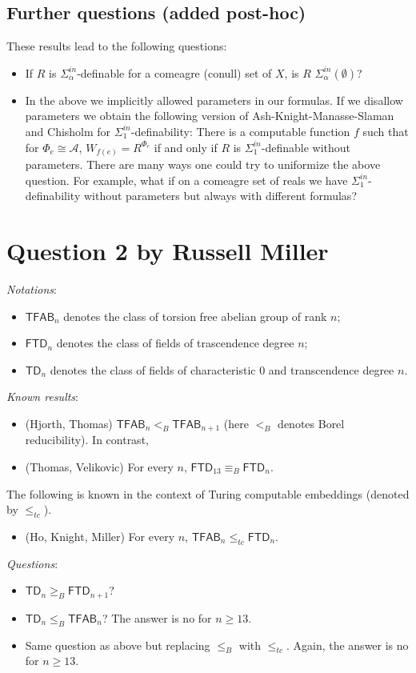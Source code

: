 \documentclass{article}
\begin{document}
\subsection*{Further questions (added post-hoc)}
These results lead to the following questions:
\begin{itemize}
    \item If $R$ is $\Sigma_\alpha^{in}$-definable for a comeagre (conull) set
        of $X$, is $R$ $\Sigma_{\alpha}^{in}(\emptyset)$?
    \item In the above we implicitly allowed parameters in our formulas. If we disallow
parameters we obtain the following version of Ash-Knight-Manasse-Slaman and
Chisholm for $\Sigma_1^{in}$-definability: There is a computable function $f$ such that for
$\Phi_e\cong \mathcal A$, $W_{f(e)}=R^{\Phi_e}$ if and only if $R$ is
$\Sigma_1^{in}$-definable without parameters. 
There are many ways one could try to uniformize the above question. For example,
what if on a comeagre set of reals we have $\Sigma^{in}_1$-definability without
parameters but always with different formulas?
\end{itemize}



\section*{Question 2 {\small{by Russell Miller}}}
\textit{Notations}:
\begin{itemize}
    \item $\mathsf{TFAB}_n$ denotes the class of torsion free abelian group of rank $n$;
    \item $\mathsf{FTD}_n$ denotes the class of fields of trascendence degree $n$;
    \item $\mathsf{TD}_n$  denotes the class of fields of characteristic $0$ and transcendence degree $n$.
\end{itemize}
\textit{Known results}:
\begin{itemize}
    \item (Hjorth, Thomas)  $\mathsf{TFAB}_n<_B \mathsf{TFAB}_{n+1}$ (here $<_B$ denotes Borel reducibility). In contrast, 
    \item (Thomas, Velikovic)   For every $n$, $\mathsf{FTD}_{13} \equiv_B \mathsf{FTD}_n$.
\end{itemize}
The following is known in the context of Turing computable embeddings (denoted by $\leq_{tc}$).
\begin{itemize}
    \item (Ho, Knight, Miller)    For every $n$, $\mathsf{TFAB}_n \leq_{tc} \mathsf{FTD}_n$.
\end{itemize}
\textit{Questions}:
\begin{itemize}
    \item $\mathsf{TD}_n \geq_B \mathsf{FTD}_{n+1}$?
    \item  $\mathsf{TD}_n \leq_B \mathsf{TFAB}_{n}$? The answer is no for $n \geq 13$.
    \item Same question as above but replacing $\leq_B$ with $\leq_{tc}$. Again, the answer is no for $n\geq13$.
\end{itemize}
\end{document}
